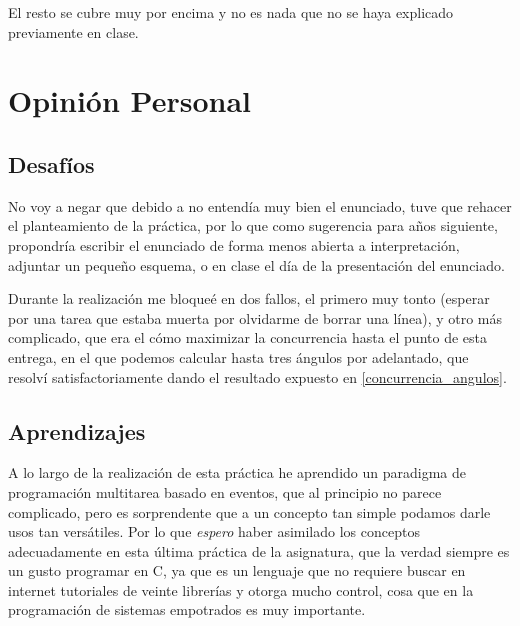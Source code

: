 \documentclass[a4paper,openright,12pt]{article}
\begin{document}
El resto se cubre muy por encima y no es nada que no se haya explicado previamente en clase.


\clearpage
\section{Opinión Personal}
\subsection{Desafíos}
No voy a negar que debido a no entendía muy bien el enunciado, tuve que rehacer el planteamiento de la práctica, por lo que como sugerencia para años siguiente, propondría escribir
el enunciado de forma menos abierta a interpretación, adjuntar un pequeño esquema, o en clase el día de la presentación del enunciado.

Durante la realización me bloqueé en dos fallos, el primero muy tonto (esperar por una tarea que estaba muerta por olvidarme de borrar una línea), y otro más complicado, que era el cómo
maximizar la concurrencia hasta el punto de esta entrega, en el que podemos calcular hasta tres ángulos por adelantado, que resolví satisfactoriamente dando el resultado expuesto
en \ref{concurrencia_angulos}.

\subsection{Aprendizajes}
A lo largo de la realización de esta práctica he aprendido un paradigma de programación multitarea basado en eventos, que al principio no parece complicado, pero es sorprendente que
a un concepto tan simple podamos darle usos tan versátiles. Por lo que \emph{espero} haber asimilado los conceptos adecuadamente en esta última práctica de la asignatura, que la verdad
siempre es un gusto programar en C, ya que es un lenguaje que no requiere buscar en internet tutoriales de veinte librerías y otorga mucho control, cosa que en la programación de sistemas
empotrados es muy importante.


\clearpage
\begin{flushleft}
\printbibliography[]{}
\end{flushleft}
\end{document}
